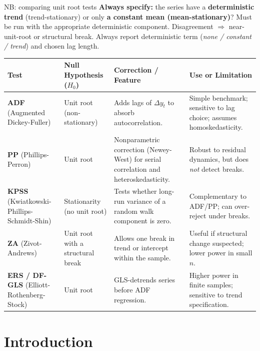 \documentclass{beamer}
\begin{document}
\begin{frame}{NB: comparing unit root tests}
\tiny
\textbf{Always specify:} the series have a \textbf{deterministic trend} (trend-stationary) 
or only\textbf{ a constant mean (mean-stationary)}? Must be run with the appropriate deterministic component. Disagreement $\Rightarrow$ near-unit-root or structural break.
Always report deterministic term (\textit{none / constant / trend}) and chosen lag length.

\begin{tabular}{p{1.7cm}p{2.4cm}p{2.6cm}p{3.3cm}}
\toprule
\textbf{Test} & \textbf{Null Hypothesis ($H_0$)} & \textbf{Correction / Feature} & \textbf{Use or Limitation} \\
\midrule
\textbf{ADF} (Augmented Dickey-Fuller)&
Unit root (non-stationary) &
Adds lags of $\Delta y_t$ to absorb autocorrelation. &
Simple benchmark; sensitive to lag choice; assumes homoskedasticity. \\[0.1cm]

\textbf{PP} (Phillips-Perron)&
Unit root &
Nonparametric correction (Newey-West) for serial correlation and heteroskedasticity.&
Robust to residual dynamics, but does \emph{not} detect breaks. \\[0.1cm]

\textbf{KPSS} (Kwiatkowski-Phillips-Schmidt-Shin)&
Stationarity (no unit root) &
Tests whether long-run variance of a random walk component is zero. &
Complementary to ADF/PP; can over-reject under breaks. \\[0.1cm]

\textbf{ZA} (Zivot-Andrews)&
Unit root with a structural break&
Allows one break in trend or intercept within the sample. &
Useful if structural change suspected; lower power in small $n$. \\[0.1cm]

\textbf{ERS / DF-GLS} (Elliott-Rothenberg-Stock)&
Unit root &
GLS-detrends series before ADF regression. &
Higher power in finite samples; sensitive to trend specification. \\
\bottomrule
\end{tabular}


\end{frame}

\section{Introduction}
\end{document}
